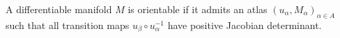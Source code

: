 A differentiable manifold $M$ is orientable if it admits an atlas $(u_\alpha, M_\alpha)_{\alpha \in A}$ such that all transition maps $u_\beta \circ u_\alpha^{-1}$ have positive Jacobian determinant.